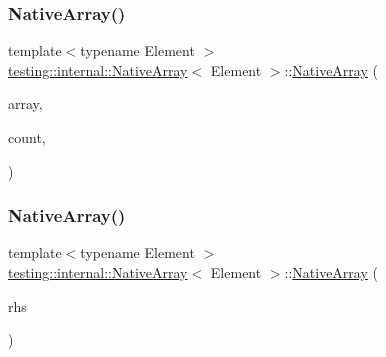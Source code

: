 \mbox{\label{classtesting_1_1internal_1_1NativeArray_ac184ee5741af5be3402213819c834405}} 
\subsubsection{\texorpdfstring{Native\+Array()}{NativeArray()}\hspace{0.1cm}{\footnotesize\ttfamily [2/3]}}
{\footnotesize\ttfamily template$<$typename Element $>$ \\
\hyperlink{classtesting_1_1internal_1_1NativeArray}{testing\+::internal\+::\+Native\+Array}$<$ Element $>$\+::\hyperlink{classtesting_1_1internal_1_1NativeArray}{Native\+Array} (\begin{DoxyParamCaption}\item[{const Element $\ast$}]{array,  }\item[{size\+\_\+t}]{count,  }\item[{\hyperlink{structtesting_1_1internal_1_1RelationToSourceCopy}{Relation\+To\+Source\+Copy}}]{ }\end{DoxyParamCaption})\hspace{0.3cm}{\ttfamily [inline]}}

\mbox{\label{classtesting_1_1internal_1_1NativeArray_abb346ac3040f5da733f594cc2d5958bc}} 
\subsubsection{\texorpdfstring{Native\+Array()}{NativeArray()}\hspace{0.1cm}{\footnotesize\ttfamily [3/3]}}
{\footnotesize\ttfamily template$<$typename Element $>$ \\
\hyperlink{classtesting_1_1internal_1_1NativeArray}{testing\+::internal\+::\+Native\+Array}$<$ Element $>$\+::\hyperlink{classtesting_1_1internal_1_1NativeArray}{Native\+Array} (\begin{DoxyParamCaption}\item[{const \hyperlink{classtesting_1_1internal_1_1NativeArray}{Native\+Array}$<$ Element $>$ \&}]{rhs }\end{DoxyParamCaption})\hspace{0.3cm}{\ttfamily [inline]}}

